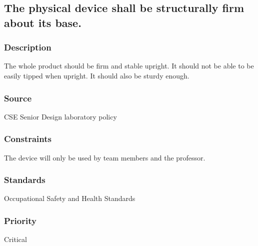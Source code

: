 \subsection{The physical device shall be structurally firm about its base.}
\subsubsection{Description}
The whole product should be firm and stable upright. It should not be able to be easily tipped when upright. It should also be sturdy enough.
\subsubsection{Source}
CSE Senior Design laboratory policy
\subsubsection{Constraints}
The device will only be used by team members and the professor.
\subsubsection{Standards}
Occupational Safety and Health Standards
\subsubsection{Priority}
Critical
